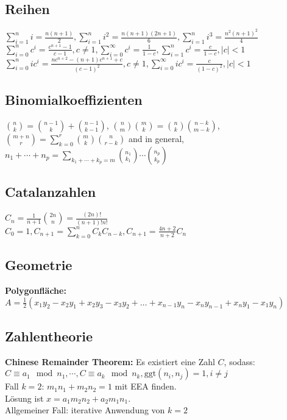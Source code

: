 \documentclass[10pt,a4paper,ngerman,oneside,]{article}
\begin{document}
\begin{multicols}{2}
\subsection{Reihen}
$
\sum\limits_{i=1}^{n}i=\frac{n(n+1)}{2}, \sum\limits_{i=1}^{n}i^2=\frac{n(n+1)(2n+1)}{6}, \sum\limits_{i=1}^{n}i^3=\frac{n^2(n+1)^2}{4}
$\\
$
\sum\limits_{i=0}^{n}c^i=\frac{c^{n+1}-1}{c-1},c\neq 1, \sum\limits_{i=0}^{\infty}c^i=\frac{1}{1-c}, \sum\limits_{i=1}^{n}c^i=\frac{c}{1-c},|c|<1
$\\
$
\sum\limits_{i=0}^{n}ic^i=\frac{nc^{n+2}-(n+1)c^{n+1}+c}{(c-1)^2}, c\neq 1, \sum\limits_{i=0}^{\infty}ic^i=\frac{c}{(1-c)^2}, |c|<1
$

\subsection{Binomialkoeffizienten}
$
{n \choose k} = {n-1 \choose k} + {n-1 \choose k-1}
$,
$
{n \choose m}{m \choose k} = {n \choose k}{n-k \choose m-k}
$,
$
{m+n \choose r} = \sum_{k=0}^r {m \choose k}{n \choose r-k}
$ and in general,
$
{n_1 + \cdots + n_p} = \sum_{k_1 + \cdots + k_p = m} {n_1 \choose k_1}
\cdots {n_p \choose k_p}
$
\subsection{Catalanzahlen}
$
C_n=\frac{1}{n+1}\binom{2n}{n}=\frac{(2n)!}{(n+1)!n!}
$\\
$
C_0=1, C_{n+1}=\sum\limits_{k=0}^{n}C_kC_{n-k}, C_{n+1}=\frac{4n+2}{n+2}C_n
$

\subsection{Geometrie}
\textbf{Polygonfläche:} $A=\frac{1}{2}(x_1y_2-x_2y_1+x_2y_3-x_3y_2+\dots+x_{n-1}y_n-x_ny_{n-1}+x_ny_1-x_1y_n)$


\subsection{Zahlentheorie}
\textbf{Chinese Remainder Theorem:} Es existiert eine Zahl $C$, sodass:\\
$
C\equiv a_1\mod n_1,\cdots, C\equiv a_k\mod n_k, \mathrm{ggt}(n_i,n_j)=1,i\neq j
$\\
Fall $k=2$: $m_1n_1+m_2n_2=1$ mit EEA finden.\\
Lösung ist $x=a_1m_2n_2+a_2m_1n_1$.\\
Allgemeiner Fall: iterative Anwendung von $k=2$


\end{multicols}
\end{document}
